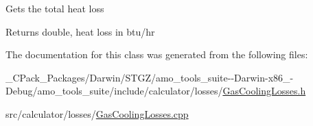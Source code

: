 Gets the total heat loss \begin{DoxyReturn}{Returns}
double, heat loss in btu/hr 
\end{DoxyReturn}


The documentation for this class was generated from the following files\+:\begin{DoxyCompactItemize}
\item 
\+\_\+\+C\+Pack\+\_\+\+Packages/\+Darwin/\+S\+T\+G\+Z/amo\+\_\+tools\+\_\+suite-\/-\/\+Darwin-\/x86\+\_-\/\+Debug/amo\+\_\+tools\+\_\+suite/include/calculator/losses/\hyperlink{___c_pack___packages_2_darwin_2_s_t_g_z_2amo__tools__suite--_darwin-x86__64-_debug_2amo__tools__5932f41982c582eb9a7216534ce16f51}{Gas\+Cooling\+Losses.\+h}\item 
src/calculator/losses/\hyperlink{_gas_cooling_losses_8cpp}{Gas\+Cooling\+Losses.\+cpp}\end{DoxyCompactItemize}
